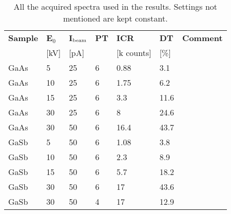 \begin{table}[phtb]
    \begin{center}
        \caption{
            All the acquired spectra used in the results.
            Settings not mentioned are kept constant.
        }
        \renewcommand*{\arraystretch}{1.4}
        \label{tab:method:acquisition_settings:all_spectra}
        \begin{tabular}{llllllp{3.5cm}}
            \hline
            \textbf{Sample} & \textbf{E$_0$} & \textbf{I$_\textnormal{beam}$} & \textbf{PT} & \textbf{ICR} & \textbf{DT} & \textbf{Comment}          \\
                            & [kV]           & [pA]                           &             & [k counts]   & [\%]        &                           \\
            \hline
            GaAs            & 5              & 25                             & 6           & 0.88         & 3.1         &                           \\
            GaAs            & 10             & 25                             & 6           & 1.75         & 6.2         &                           \\
            GaAs            & 15             & 25                             & 6           & 3.3          & 11.6        &                           \\
            GaAs            & 30             & 25                             & 6           & 8            & 24.6        &                           \\
            GaAs            & 30             & 50                             & 6           & 16.4         & 43.7        &                           \\
            GaSb            & 5              & 50                             & 6           & 1.08         & 3.8         &                           \\
            GaSb            & 10             & 50                             & 6           & 2.3          & 8.9         &                           \\
            GaSb            & 15             & 50                             & 6           & 5.7          & 18.2        &                           \\
            GaSb            & 30             & 50                             & 6           & 17           & 43.6        &                           \\
            GaSb            & 30             & 50                             & 4           & 17           & 12.9        &                           \\

\end{tabular}
\end{center}
\end{table}

